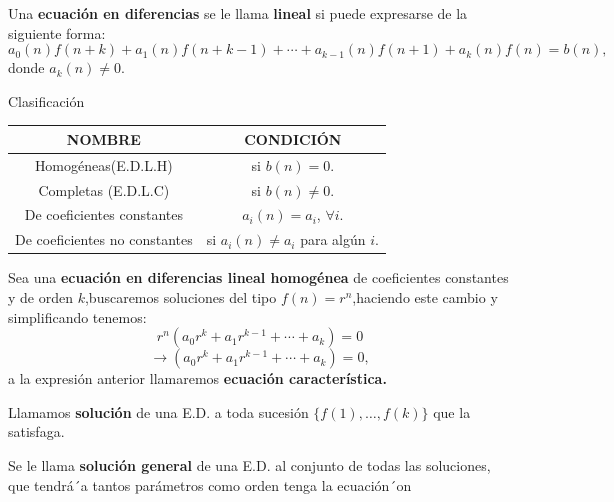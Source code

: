 \begin{frame}
	\begin{definition}
		Una \textbf{ecuación en diferencias} se le llama \textbf{lineal}	  si puede expresarse de la siguiente forma:
		\begin{equation}\label{edl} a_{0}(n)f\left(n+k\right)+a_{1}(n)f\left(n+k-1\right)+\cdots+a_{k-1}(n)f\left(n+1\right)+a_{k}(n)f\left(n\right)=b\left(n\right), 
		\end{equation}
		donde $a_{k}(n)\neq0$.
	\end{definition}
  \begin{block}{Clasificación}
	\begin{table}[H]
		\centering
	\begin{tabular}{|c|c|}
				\hline
		   \alert{NOMBRE} & \alert{CONDICIÓN}\\
		   \hline
			Homogéneas(E.D.L.H) &si $b(n)=0$.\\
			\hline
			Completas (E.D.L.C) &si $b(n)\neq0$.\\
			\hline
			De coeficientes constantes & $a_{i}(n)=a_{i}$, $\forall i$.\\
			\hline
			De coeficientes no constantes &si $a_{i}(n)\neq a_{i}$ para algún $i$.\\
			\hline
		\end{tabular}
		\end{table}
	\end{block}
\end{frame}
\begin{frame}
\begin{definition}
	Sea una \textbf{ecuación en diferencias lineal homogénea} de coeficientes constantes y de orden $ k $,buscaremos soluciones del tipo  $f(n)=r^{n}$,haciendo este cambio y simplificando  tenemos:
	$$
	r^{n}(a_{0}r^{k}+a_{1}r^{k-1}+\cdots+a_{k})=0
	$$
	$$
	\rightarrow (a_{0}r^{k}+a_{1}r^{k-1}+\cdots+a_{k})=0,
	$$
	a la expresión anterior llamaremos \textbf{ecuación característica.}
\end{definition}
\begin{definition}
	Llamamos \textbf{solución} de una E.D. a toda sucesión $\{ f(1), \ldots, f(k) \}$ que la satisfaga.
\end{definition}
\begin{definition}
	Se le llama \textbf{solución general} de una E.D. al conjunto de todas las soluciones, que tendrá´a
	tantos parámetros como orden tenga la ecuación´on
\end{definition}
\end{frame}
